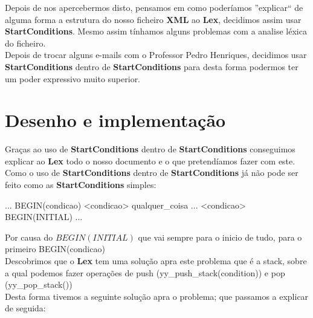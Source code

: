 \documentclass[11pt,a4paper]{article}
\begin{document}
Depois de nos apercebermos disto, pensamos em como poderíamos ''explicar`` de alguma forma a estrutura do nosso ficheiro \textbf{XML} ao \textbf{Lex}, decidimos assim usar \textbf{StartConditions}. Mesmo assim tínhamos alguns problemas com a analise léxica do ficheiro.\\

Depois de trocar alguns e-mails com o Professor Pedro Henriques, decidimos usar \textbf{StartConditions} dentro de \textbf{StartConditions} para desta forma podermos ter um poder expressivo muito superior.

\section{Desenho e implementação}
Graças ao uso de \textbf{StartConditions} dentro de \textbf{StartConditions} conseguimos explicar ao \textbf{Lex} todo o nosso documento e o que pretendíamos fazer com este.\\

Como o uso de \textbf{StartConditions} dentro de \textbf{StartConditions} já não pode ser feito como as \textbf{StartConditions} simples:

\begin{code_lex}
...         BEGIN(condicao)
<condicao>  qualquer_coisa
...
<condicao>  BEGIN(INITIAL)
...
\end{code_lex}

Por causa do \textsf{$BEGIN(INITIAL)$} que vai sempre para o inicio de tudo, para o primeiro \textsf{BEGIN(condicao)}\\

Descobrimos que o \textbf{Lex} tem uma solução apra este problema que é a \textsf{stack}, sobre a qual podemos fazer operações de \textsf{push (yy\_push\_stack(condition))} e \textsf{pop (yy\_pop\_stack())}\\

Desta forma tivemos a seguinte solução apra o problema; que passamos a explicar de seguida:\\
\end{document}
